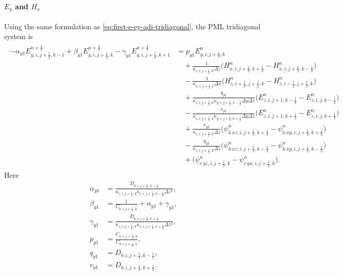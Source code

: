 \documentclass{article}
\numberwithin{equation}{section}
\numberwithin{figure}{section}
\begin{document}
\paragraph{$E_y$ and $H_x$}
Using the same formulation as \eqref{eq:first-e-ey-adi-tridiagonal}, the PML tridiagonal system is
\begin{align}
    \begin{split}
        -\alpha_{y1}E_{y,i,j+\tfrac12,k-1}^{n+\frac12} + \beta_{y1}E_{y,i,j+\tfrac12,k}^{n+\frac12} - \gamma_{y1}E_{y,i,j+\tfrac12,k+1}^{n+\frac12}
         & = p_{y1}E_{y,i,j+\tfrac12,k}^{n}                                                                                                                               \\
         & \quad +\frac{1}{\kappa_{z,i,j+\tfrac12,k}\Delta z}\Big(H_{x,i,j+\tfrac12,k+\tfrac12}^{n}-H_{x,i,j+\tfrac12,k-\tfrac12}^{n}\Big)                                \\
         & \quad -\frac{1}{\kappa_{x,i,j+\tfrac12,k}\Delta x}\Big(H_{z,i+\tfrac12,j+\tfrac12,k}^{n}-H_{z,i-\tfrac12,j+\tfrac12,k}^{n}\Big)                                \\
         & \quad +\frac{q_{y1}}{\kappa_{z,i,j+\tfrac12,k}\kappa_{y,i,j+\tfrac12,k-\tfrac12}\Delta y\Delta z}\Big(E_{z,i,j+1,k-\tfrac12}^{n}-E_{z,i,j,k-\tfrac12}^{n}\Big) \\
         & \quad -\frac{r_{y1}}{\kappa_{z,i,j+\tfrac12,k}\kappa_{y,i,j+\tfrac12,k+\tfrac12}\Delta y\Delta z}\Big(E_{z,i,j+1,k+\tfrac12}^{n}-E_{z,i,j,k+\tfrac12}^{n}\Big) \\
         & \quad +\frac{r_{y1}}{\kappa_{z,i,j+\tfrac12,k}\Delta z}\Big(\psi^{n}_{h\,xz,i,j+\tfrac12,k+\tfrac12} - \psi^{n}_{h\,xy,i,j+\tfrac12,k+\tfrac12}\Big)           \\
         & \quad -\frac{q_{y1}}{\kappa_{z,i,j+\tfrac12,k}\Delta z}\Big(\psi^{n}_{h\,xz,i,j+\tfrac12,k-\tfrac12} - \psi^{n}_{h\,xy,i,j+\tfrac12,k-\tfrac12}\Big)           \\
         & \quad +\Big(\psi^{n}_{e\,yz,i,j+\tfrac12,k}-\psi^{n}_{e\,yx,i,j+\tfrac12,k}\Big).
    \end{split}
    \label{eq:first-e-ey-pml-adi-tridiagonal}
\end{align}
Here
\begin{align}
    \alpha_{y1} & =\frac{D_{b,i,j+\tfrac12,k-\tfrac12}}{\kappa_{z,i,j+\tfrac12,k}\kappa_{z,i,j+\tfrac12,k-\tfrac12}\Delta z^2}, \\
    \beta_{y1}  & =\frac{1}{C_{b,i,j+\tfrac12,k}}+\alpha_{y1}+\gamma_{y1},                                                      \\
    \gamma_{y1} & =\frac{D_{b,i,j+\tfrac12,k+\tfrac12}}{\kappa_{z,i,j+\tfrac12,k}\kappa_{z,i,j+\tfrac12,k+\tfrac12}\Delta z^2}, \\
    p_{y1}      & =\frac{C_{a,i,j+\tfrac12,k}}{C_{b,i,j+\tfrac12,k}},                                                           \\
    q_{y1}      & =D_{b,i,j+\tfrac12,k-\tfrac12},                                                                               \\
    r_{y1}      & =D_{b,i,j+\tfrac12,k+\tfrac12}.
\end{align}
\end{document}
